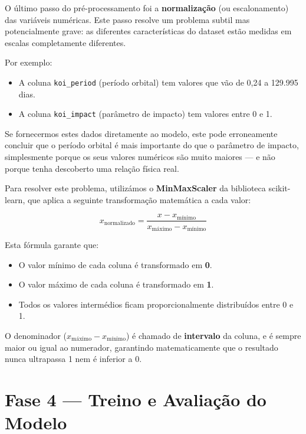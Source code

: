 \documentclass[12pt, a4paper]{report}
\begin{document}
O último passo do pré-processamento foi a \textbf{normalização} (ou escalonamento) das variáveis numéricas. Este passo resolve um problema subtil mas potencialmente grave: as diferentes características do dataset estão medidas em escalas completamente diferentes.

Por exemplo:
\begin{itemize}
    \item A coluna \texttt{koi\_period} (período orbital) tem valores que vão de 0,24 a 129.995 dias.
    \item A coluna \texttt{koi\_impact} (parâmetro de impacto) tem valores entre 0 e 1.
\end{itemize}

Se fornecermos estes dados diretamente ao modelo, este pode erroneamente concluir que o período orbital é mais importante do que o parâmetro de impacto, simplesmente porque os seus valores numéricos são muito maiores — e não porque tenha descoberto uma relação física real.

Para resolver este problema, utilizámos o \textbf{MinMaxScaler} da biblioteca scikit-learn, que aplica a seguinte transformação matemática a cada valor:

\begin{equation}
    x_{\text{normalizado}} = \frac{x - x_{\text{mínimo}}}{x_{\text{máximo}} - x_{\text{mínimo}}}
\end{equation}

Esta fórmula garante que:
\begin{itemize}
    \item O valor mínimo de cada coluna é transformado em \textbf{0}.
    \item O valor máximo de cada coluna é transformado em \textbf{1}.
    \item Todos os valores intermédios ficam proporcionalmente distribuídos entre 0 e 1.
\end{itemize}

O denominador ($x_{\text{máximo}} - x_{\text{mínimo}}$) é chamado de \textbf{intervalo} da coluna, e é sempre maior ou igual ao numerador, garantindo matematicamente que o resultado nunca ultrapassa 1 nem é inferior a 0.

\chapter{Fase 4 — Treino e Avaliação do Modelo}
\end{document}
